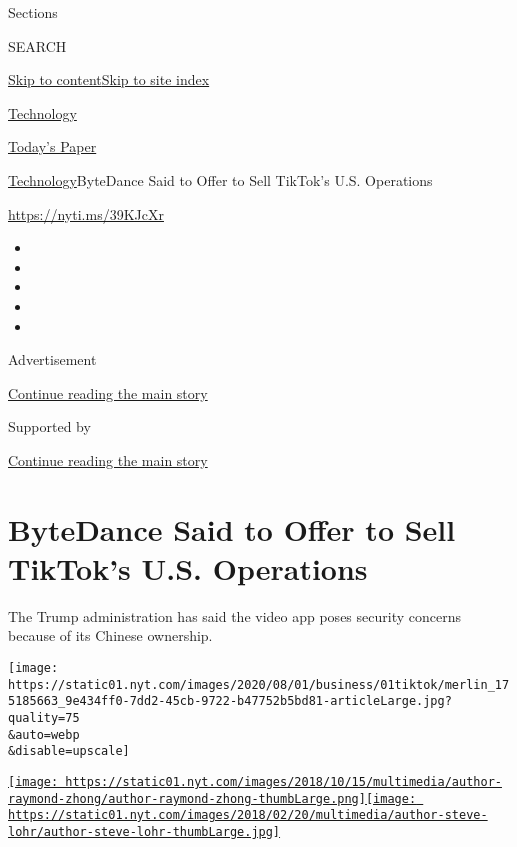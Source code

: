 Sections

SEARCH

\protect\hyperlink{site-content}{Skip to
content}\protect\hyperlink{site-index}{Skip to site index}

\href{https://www.nytimes.com/section/technology}{Technology}

\href{https://myaccount.nytimes.com/auth/login?response_type=cookie\&client_id=vi}{}

\href{https://www.nytimes.com/section/todayspaper}{Today's Paper}

\href{/section/technology}{Technology}\textbar{}ByteDance Said to Offer
to Sell TikTok's U.S. Operations

\url{https://nyti.ms/39KJcXr}

\begin{itemize}
\item
\item
\item
\item
\item
\end{itemize}

Advertisement

\protect\hyperlink{after-top}{Continue reading the main story}

Supported by

\protect\hyperlink{after-sponsor}{Continue reading the main story}

\hypertarget{bytedance-said-to-offer-to-sell-tiktoks-us-operations}{%
\section{ByteDance Said to Offer to Sell TikTok's U.S.
Operations}\label{bytedance-said-to-offer-to-sell-tiktoks-us-operations}}

The Trump administration has said the video app poses security concerns
because of its Chinese ownership.

\texttt{[image: https://static01.nyt.com/images/2020/08/01/business/01tiktok/merlin\_175185663\_9e434ff0-7dd2-45cb-9722-b47752b5bd81-articleLarge.jpg?quality=75\\\&auto=webp\\\&disable=upscale]}

\href{https://www.nytimes.com/by/raymond-zhong}{\texttt{[image: https://static01.nyt.com/images/2018/10/15/multimedia/author-raymond-zhong/author-raymond-zhong-thumbLarge.png]}}\href{https://www.nytimes.com/by/steve-lohr}{\texttt{[image: https://static01.nyt.com/images/2018/02/20/multimedia/author-steve-lohr/author-steve-lohr-thumbLarge.jpg]}}

